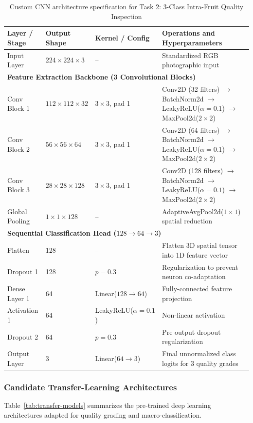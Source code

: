 \documentclass[11pt,a4paper]{article}
\begin{document}
\begin{table}[H]
\centering\small
\begin{tabularx}{\textwidth}{|l|l|l|X|}
\hline
\textbf{Layer / Stage} & \textbf{Output Shape} & \textbf{Kernel / Config} & \textbf{Operations and Hyperparameters} \\
\hline
Input Layer & $224 \times 224 \times 3$ & -- & Standardized RGB photographic input \\
\hline
\multicolumn{4}{|l|}{\textbf{Feature Extraction Backbone (3 Convolutional Blocks)}} \\
\hline
Conv Block 1 & $112 \times 112 \times 32$ & $3 \times 3$, pad 1 & Conv2D (32 filters) $\to$ BatchNorm2d $\to$ LeakyReLU($\alpha=0.1$) $\to$ MaxPool2d($2\times2$) \\ \hline
Conv Block 2 & $56 \times 56 \times 64$ & $3 \times 3$, pad 1 & Conv2D (64 filters) $\to$ BatchNorm2d $\to$ LeakyReLU($\alpha=0.1$) $\to$ MaxPool2d($2\times2$) \\ \hline
Conv Block 3 & $28 \times 28 \times 128$ & $3 \times 3$, pad 1 & Conv2D (128 filters) $\to$ BatchNorm2d $\to$ LeakyReLU($\alpha=0.1$) $\to$ MaxPool2d($2\times2$) \\ \hline
Global Pooling & $1 \times 1 \times 128$ & -- & AdaptiveAvgPool2d($1 \times 1$) spatial reduction \\ \hline
\multicolumn{4}{|l|}{\textbf{Sequential Classification Head ($128 \to 64 \to 3$)}} \\
\hline
Flatten & 128 & -- & Flatten 3D spatial tensor into 1D feature vector \\ \hline
Dropout 1 & 128 & $p = 0.3$ & Regularization to prevent neuron co-adaptation \\ \hline
Dense Layer 1 & 64 & Linear($128 \to 64$) & Fully-connected feature projection \\ \hline
Activation 1 & 64 & LeakyReLU($\alpha=0.1$) & Non-linear activation \\ \hline
Dropout 2 & 64 & $p = 0.3$ & Pre-output dropout regularization \\ \hline
Output Layer & 3 & Linear($64 \to 3$) & Final unnormalized class logits for 3 quality grades \\ \hline
\end{tabularx}
\caption{Custom CNN architecture specification for Task 2: 3-Class Intra-Fruit Quality Inspection}
\label{tab:custom-cnn-quality}
\end{table}

\subsubsection{Candidate Transfer-Learning Architectures}
Table~\ref{tab:transfer-models} summarizes the pre-trained deep learning architectures adapted for quality grading and macro-classification.
\end{document}

